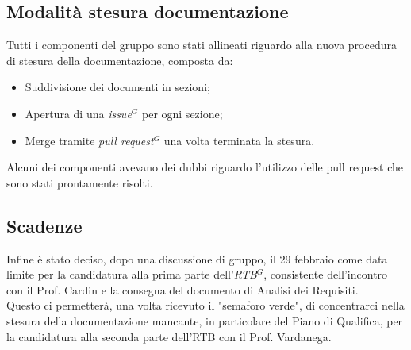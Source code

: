 \documentclass[a4paper, 11pt]{article}
\begin{document}
\subsection{Modalità stesura documentazione}
Tutti i componenti del gruppo sono stati allineati riguardo alla nuova procedura di stesura della documentazione, composta da: 
\begin{itemize}
    \item Suddivisione dei documenti in sezioni;
    \item Apertura di una \emph{issue}$^{G}$ per ogni sezione;
    \item Merge tramite \emph{pull request}$^{G}$ una volta terminata la stesura.
\end{itemize}

Alcuni dei componenti avevano dei dubbi riguardo l'utilizzo delle pull request che sono stati prontamente risolti.

\subsection{Scadenze}
Infine è stato deciso, dopo una discussione di gruppo, il 29 febbraio come data limite per la candidatura alla prima parte dell'\emph{RTB}$^{G}$, consistente dell'incontro con il Prof. Cardin e la consegna del documento di Analisi dei Requisiti. \\
Questo ci permetterà, una volta ricevuto il "semaforo verde", di concentrarci nella stesura della documentazione mancante, in particolare del Piano di Qualifica, per la candidatura alla seconda parte dell'RTB con il Prof. Vardanega.
\end{document}
